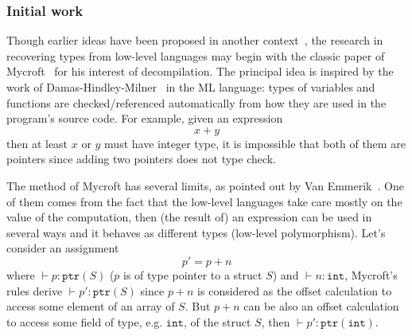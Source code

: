 \documentclass[compsoc,conference,a4paper,10pt,times]{IEEEtran}
\begin{document}
\subsubsection*{Initial work}
\noindent
Though earlier ideas have been proposed in another context~\cite{shivers_data-flow_1990},
the research in recovering types from low-level languages may begin with the classic paper of
Mycroft~\cite{mycroft_type-based_1999} for his interest of decompilation. The principal idea is
inspired by the work of Damas-Hindley-Milner~\cite{milner_theory_1978,hindley_principal_1969,damas_principal_1982} in
the ML language: types of variables and functions are checked/referenced automatically
from how they are used in the program's source code. For example, given an expression
\begin{equation*}
  x + y
\end{equation*}
then at least $x$ or $y$ must have integer type, it is impossible that both of them are pointers
since adding two pointers does not type check.

The method of Mycroft has several limits, as pointed out by Van Emmerik~\cite{van_emmerik_static_2007}.
One of them comes from the fact that the low-level languages take care mostly on the value of
the computation, then (the result of) an expression can be used in several ways and it behaves as
different types (low-level polymorphism). Let's consider an assignment
\begin{equation*}
  p' = p + n
\end{equation*}
where $\vdash p \colon \mathtt{ptr}(S)$ ($p$ is of type pointer to a struct $S$) and
$\vdash n \colon \mathtt{int}$, Mycroft's
rules derive $\vdash p' \colon \mathtt{ptr}(S)$ since $p + n$ is considered as the offset calculation to
access some element of an array of $S$. But $p + n$ can be also an
offset calculation to access some field of type, e.g. $\mathtt{int}$, of the struct $S$,
then $\vdash p' \colon \mathtt{ptr}(\mathtt{int})$.
\end{document}
